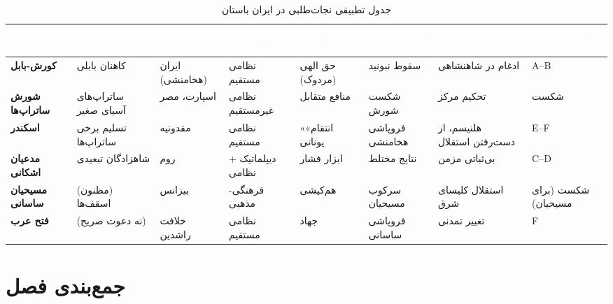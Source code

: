 \begin{landscape}
\begin{table}[htbp]
\centering
\caption{جدول تطبیقی نجات‌طلبی در ایران باستان}\label{tab:ch04-comparative}
\begin{adjustbox}{max width=\linewidth}
\begin{tabular}{
  >{\raggedleft\arraybackslash\bfseries\small}p{2.2cm}
  >{\raggedleft\arraybackslash\small}p{2.5cm}
  >{\raggedleft\arraybackslash\small}p{2cm}
  >{\raggedleft\arraybackslash\small}p{2cm}
  >{\raggedleft\arraybackslash\small}p{2cm}
  >{\raggedleft\arraybackslash\small}p{2.5cm}
  >{\raggedleft\arraybackslash\small}p{2cm}
  >{\raggedleft\arraybackslash\small}p{2cm}}
\toprule
\rowcolor{PrimaryDeep}
\textcolor{white}{مورد} &
\textcolor{white}{دعوت‌کننده} &
\textcolor{white}{مداخله‌گر} &
\textcolor{white}{نوع مداخله} &
\textcolor{white}{مبنای مشروعیت} &
\textcolor{white}{نتیجه‌ی فوری} &
\textcolor{white}{نتیجه‌ی بلندمدت} &
\textcolor{white}{جایگاه طیفی} \\
\midrule

کورش-بابل &
کاهنان بابلی &
ایران (هخامنشی) &
نظامی مستقیم &
حق الهی (مردوک) &
سقوط نبونید &
ادغام در شاهنشاهی &
A–B \\
\rowcolor{NeutralLight}
شورش ساتراپ‌ها &
ساتراپ‌های آسیای صغیر &
اسپارت، مصر &
نظامی غیرمستقیم &
منافع متقابل &
شکست شورش &
تحکیم مرکز &
شکست \\
اسکندر &
تسلیم برخی ساتراپ‌ها &
مقدونیه &
نظامی مستقیم &
«انتقام» یونانی &
فروپاشی هخامنشی &
هلنیسم، از دست‌رفتن استقلال &
E–F \\
\rowcolor{NeutralLight}
مدعیان اشکانی &
شاهزادگان تبعیدی &
روم &
دیپلماتیک + نظامی &
ابزار فشار &
نتایج مختلط &
بی‌ثباتی مزمن &
C–D \\
مسیحیان ساسانی &
(مظنون) اسقف‌ها &
بیزانس &
فرهنگی-مذهبی &
هم‌کیشی &
سرکوب مسیحیان &
استقلال کلیسای شرق &
شکست (برای مسیحیان) \\
\rowcolor{NeutralLight}
فتح عرب &
(نه دعوت صریح) &
خلافت راشدین &
نظامی مستقیم &
جهاد &
فروپاشی ساسانی &
تغییر تمدنی &
F \\

\bottomrule
\end{tabular}
\end{adjustbox}
\end{table}
\end{landscape}

\section{جمع‌بندی فصل}
\label{sec:ch04-summary}

